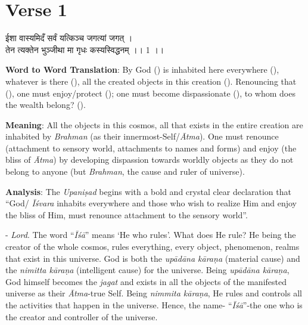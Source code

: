 \chapter{Verse 1}

\begin{moolashloka}
ईशा वास्यमिदँ सर्वं यत्किञ्च जगत्यां जगत् ।\\
तेन त्यक्तेन भुञ्जीथा मा गृधः कस्यस्विद्धनम् ।। 1 ।।
\end{moolashloka}

\textbf{Word to Word Translation}: By God () is inhabited here everywhere (), whatever is there (), all the created objects in this creation (). Renouncing that (), one must enjoy/protect (); one must become dispassionate (), to whom does the wealth belong? ().

\textbf{Meaning}: All the objects in this cosmos, all that exists in the entire creation are inhabited by \emph{Brahman} (as their innermost-Self/\emph{Ātma}). One must renounce (attachment to sensory world, attachments to names and forms) and enjoy (the bliss of \emph{Ātma}) by developing dispassion towards worldly objects as they do not belong to anyone (but \emph{Brahman}, the cause and ruler of universe).

\textbf{Analysis}: The \emph{Upaniṣad} begins with a bold and crystal clear declaration that ``God/ \emph{Īśvara} inhabits everywhere and those who wish to realize Him and enjoy the bliss of Him, must renounce attachment to the sensory world''.

- \emph{Lord}. The word ``\emph{Īśā}'' means `He who rules'. What does He rule? He being the creator of the whole cosmos, rules everything, every object, phenomenon, realms that exist in this universe. God is both the \emph{upādāna kāraṇa} (material cause) and the \emph{nimitta kāraṇa} (intelligent cause) for the universe. Being \emph{upādāna kāraṇa}, God himself becomes the \emph{jagat} and exists in all the objects of the manifested universe as their \emph{Ātma}-true Self. Being \emph{nimmita kāraṇa}, He rules and controls all the activities that happen in the universe. Hence, the name- ``\emph{Īśā}''-the one who is the creator and controller of the universe.

